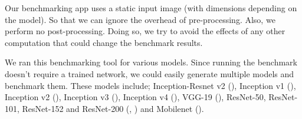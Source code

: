 Our benchmarking app uses a static input image (with dimensions depending on the model). So that we can ignore the overhead of pre-processing. Also, we perform no post-processing. Doing so, we try to avoid the effects of any other computation that could change the benchmark results. 

We ran this benchmarking tool for various models. Since running the benchmark doesn't require a trained network, we could easily generate multiple models and benchmark them. These models include; Inception-Resnet v2 (\cite{DBLP:journals/corr/SzegedyIV16}), Inception v1 (\cite{Szegedy:2014aa}), Inception v2 (\cite{Szegedy:2014aa}), Inception v3 (\cite{Szegedy_2016_CVPR}), Inception v4 (\cite{DBLP:journals/corr/SzegedyIV16}), VGG-19 (\cite{Simonyan:2014aa}), ResNet-50, ResNet-101, ResNet-152 and ResNet-200 (\cite{He:2015aa}, \cite{he2016identity}) and Mobilenet (\cite{howard2017mobilenets}).  


\iffalse


